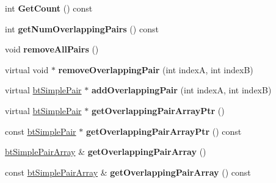 \begin{DoxyCompactItemize}
\item 
\mbox{\label{classbtHashedSimplePairCache_a40bb08d90e09cfb15193499ea8d7c232}} 
int {\bfseries Get\+Count} () const
\item 
\mbox{\label{classbtHashedSimplePairCache_a84238355185d293a1749e5e00fd87895}} 
int {\bfseries get\+Num\+Overlapping\+Pairs} () const
\item 
\mbox{\label{classbtHashedSimplePairCache_aff97f2604b1c3b0ffa2bc73458efb361}} 
void {\bfseries remove\+All\+Pairs} ()
\item 
\mbox{\label{classbtHashedSimplePairCache_ab0d3713610b6240e1117961b48c00324}} 
virtual void $\ast$ {\bfseries remove\+Overlapping\+Pair} (int indexA, int indexB)
\item 
\mbox{\label{classbtHashedSimplePairCache_ae86e64195cae4126ee4089e45633e3ae}} 
virtual \hyperlink{structbtSimplePair}{bt\+Simple\+Pair} $\ast$ {\bfseries add\+Overlapping\+Pair} (int indexA, int indexB)
\item 
\mbox{\label{classbtHashedSimplePairCache_ab88a7dd4f4f640b357a454073e833902}} 
virtual \hyperlink{structbtSimplePair}{bt\+Simple\+Pair} $\ast$ {\bfseries get\+Overlapping\+Pair\+Array\+Ptr} ()
\item 
\mbox{\label{classbtHashedSimplePairCache_afc82c3fa21d235cf6ea8f39957c96810}} 
const \hyperlink{structbtSimplePair}{bt\+Simple\+Pair} $\ast$ {\bfseries get\+Overlapping\+Pair\+Array\+Ptr} () const
\item 
\mbox{\label{classbtHashedSimplePairCache_ac0875ac64391ff59021a10ea0e6181c7}} 
\hyperlink{classbtAlignedObjectArray}{bt\+Simple\+Pair\+Array} \& {\bfseries get\+Overlapping\+Pair\+Array} ()
\item 
\mbox{\label{classbtHashedSimplePairCache_a0eebe3b875d59b98f7e32fa9f1b76912}} 
const \hyperlink{classbtAlignedObjectArray}{bt\+Simple\+Pair\+Array} \& {\bfseries get\+Overlapping\+Pair\+Array} () const

\end{DoxyCompactItemize}
